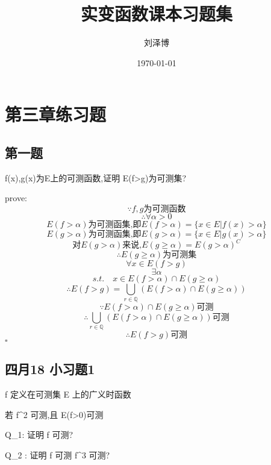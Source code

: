 \documentclass[a4paper]{article}
\title{实变函数课本习题集}
\author{刘泽博}
\date{\today}
\begin{document}
    \maketitle
    \tableofcontents
    \section{第三章练习题}    
    \subsection{第一题}

    f(x),g(x)为E上的可测函数,证明 E(f>g)为可测集?

    prove:
    \[\because f,g\text{为可测函数}\]
    \[\therefore \forall \alpha >0\]
    \[E(f>\alpha)\text{为可测函集,即}E(f>\alpha)=\{x\in E | f(x)>\alpha\}\]
    \[E(g>\alpha)\text{为可测函集,即}E(g>\alpha)=\{x\in E | g(x)>\alpha\}\]
    \[\text{对}E(g>\alpha)\text{来说,}E(g\ge\alpha)=E(g>\alpha)^C\]
    \[\therefore E(g\ge\alpha)\text{为可测集}\]
    \[\forall x \in E(f>g)\]
    \[\exists \alpha\]
    \[s.t. \quad x\in E(f>\alpha) \cap E(g \ge \alpha)\]
    \[\therefore E(f>g)=\bigcup_{r\in \mathbb{Q}}(E(f>\alpha)\cap E(g\ge \alpha))\]
    \[\because E(f>\alpha)\cap E(g\ge\alpha)\text{可测}\]
    \[\therefore \bigcup_{r\in \mathbb{Q}}(E(f>\alpha)\cap E(g\ge \alpha))\text{可测}\]
    \[\therefore E(f>g)\text{可测}\]
    \hfill $\square$

    \subsection{四月18 小习题1}
    
    f 定义在可测集 E 上的广义时函数

    若 f^2 可测,且 E(f>0)可测

    Q_1: 证明 f 可测?

    Q_2 : 证明 f 可测 \Leftrightarrow f^3 可测?
\end{document}
